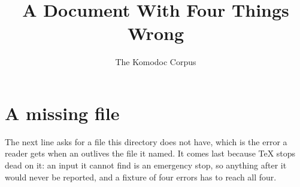 \documentclass[11pt]{article}
\title{A Document With Four Things Wrong}
\author{The Komodoc Corpus}
\date{}
\begin{document}
\maketitle



\section{A missing file}

The next line asks for a file this directory does not have, which is the
error a reader gets when an \verb|| outlives the file it named. It
comes last because \TeX{} stops dead on it: an input it cannot find is an
emergency stop, so anything after it would never be reported, and a fixture
of four errors has to reach all four.


\end{document}

